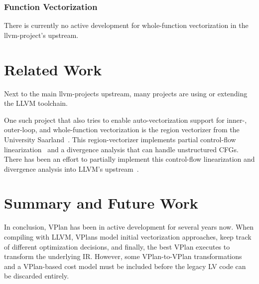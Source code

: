 \documentclass[sigplan,11pt,nonacm]{acmart}
\begin{document}
\subsubsection{Function Vectorization}
There is currently no active development for whole-function vectorization in the
llvm-project's upstream.




\section{Related Work}
\label{sec:relatedwork}
Next to the main llvm-projects upstream, many projects are using or extending the LLVM toolchain.

One such project that also tries to enable auto-vectorization support for inner-, outer-loop, and 
whole-function vectorization is the region vectorizer from the University Saarland~\cite{rv}.
This region-vectorizer implements partial control-flow linearization~\cite{10.1145/3192366.3192413}
and a divergence analysis that can handle unstructured CFGs. There has been an effort to partially
implement this control-flow linearization and divergence analysis into LLVM's 
upstream~\cite{rvproposal,rvproposaldep}.



\section{Summary and Future Work}
\label{sec:summary}
In conclusion, VPlan has been in active development for several years now. When compiling with LLVM, 
VPlans model initial vectorization approaches, keep track of different optimization decisions, 
and finally, the best VPlan executes to transform the underlying IR. 
However, some VPlan-to-VPlan transformations and a VPlan-based cost model must be included before the 
legacy LV code can be discarded entirely.
\end{document}
